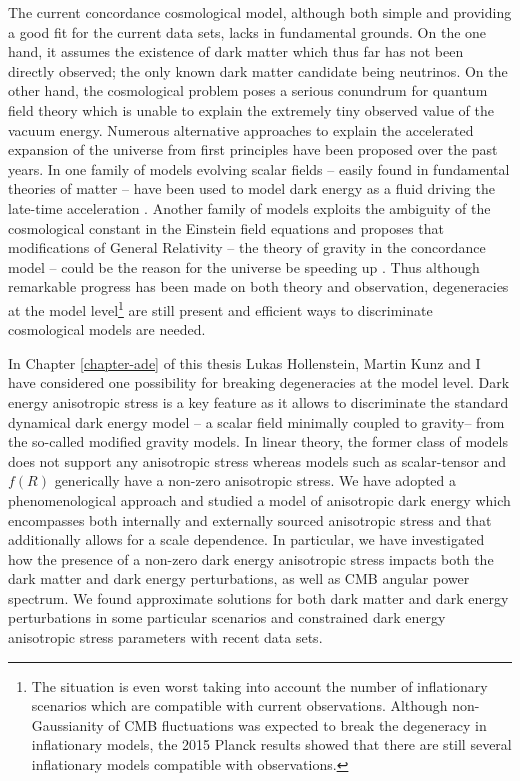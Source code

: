 The current concordance cosmological model, although both simple and providing a good fit for the current data sets, lacks in fundamental grounds. On the one hand, it assumes the existence of dark matter which thus far has not been directly observed; the only known dark matter candidate being neutrinos. On the other hand, the cosmological problem poses a serious conundrum for quantum field theory which is unable to explain the extremely tiny observed value of the vacuum energy. Numerous alternative approaches to explain the accelerated expansion of the universe from first principles have been proposed over the past years. In one family of models evolving scalar fields -- easily found in fundamental theories of matter -- have been used to model dark energy as a fluid driving the late-time acceleration . Another family of models exploits the ambiguity of the cosmological constant in the Einstein field equations and proposes that modifications of General Relativity -- the theory of gravity in the concordance model -- could be the reason for the universe be speeding up . Thus although remarkable progress has been made on both theory and observation, degeneracies at the model level\footnote{The situation is even worst taking into account the number of inflationary scenarios which are compatible with current observations. Although non-Gaussianity of CMB fluctuations was expected to break the degeneracy in inflationary models, the 2015 Planck results  showed that there are still several inflationary models compatible with observations.} are still present and efficient ways to discriminate cosmological models are needed.   

In Chapter \ref{chapter-ade} of this thesis Lukas Hollenstein, Martin Kunz and I have considered one possibility for breaking degeneracies at the model level. Dark energy anisotropic stress is a key feature as it allows to discriminate the standard dynamical dark energy model -- a scalar field minimally coupled to gravity-- from the so-called modified gravity models. In linear theory, the former class of models does not support any anisotropic stress whereas models such as scalar-tensor and $f(R)$ generically have a non-zero anisotropic stress. We have adopted a phenomenological approach and studied a model of anisotropic dark energy which encompasses both internally and externally sourced anisotropic stress and that additionally allows for a scale dependence. In particular, we have investigated how the presence of a non-zero dark energy anisotropic stress impacts both the dark matter and dark energy perturbations, as well as CMB angular power spectrum. We found approximate solutions for both dark matter and dark energy perturbations in some particular scenarios and constrained dark energy anisotropic stress parameters with recent data sets. 

